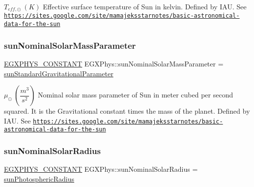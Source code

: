 $ T_{eff,\odot} \ (K)$ Effective surface temperature of Sun in kelvin. Defined by I\+AU. See \href{https://sites.google.com/site/mamajeksstarnotes/basic-astronomical-data-for-the-sun}{\tt https\+://sites.\+google.\+com/site/mamajeksstarnotes/basic-\/astronomical-\/data-\/for-\/the-\/sun} \mbox{\label{group___e_g_x_phys-_constants-_astrophysics-_solar_system-_sun-_bulk_gaadeeeb0634200ad2ad89a5b8b721dd8d}} 
\subsubsection{\texorpdfstring{sun\+Nominal\+Solar\+Mass\+Parameter}{sunNominalSolarMassParameter}}
{\footnotesize\ttfamily \mbox{\hyperlink{group___e_g_x_phys-_constants-_macros_ga76980d288494ce1714c9ac68a95ba702}{E\+G\+X\+P\+H\+Y\+S\+\_\+\+C\+O\+N\+S\+T\+A\+NT}} E\+G\+X\+Phys\+::sun\+Nominal\+Solar\+Mass\+Parameter = \mbox{\hyperlink{group___e_g_x_phys-_constants-_astrophysics-_solar_system-_sun-_bulk_ga17d411dceb8d2ff98b8a270eaa72117d}{sun\+Standard\+Gravitational\+Parameter}}}

$ \mu_{\odot} \ (\dfrac{m^3}{s^2})$ Nominal solar mass parameter of Sun in meter cubed per second squared. It is the Gravitational constant times the mass of the planet. Defined by I\+AU. See \href{https://sites.google.com/site/mamajeksstarnotes/basic-astronomical-data-for-the-sun}{\tt https\+://sites.\+google.\+com/site/mamajeksstarnotes/basic-\/astronomical-\/data-\/for-\/the-\/sun} \mbox{\label{group___e_g_x_phys-_constants-_astrophysics-_solar_system-_sun-_bulk_ga5bebe7d507ffd0372e8e1a20e3662d5d}} 
\subsubsection{\texorpdfstring{sun\+Nominal\+Solar\+Radius}{sunNominalSolarRadius}}
{\footnotesize\ttfamily \mbox{\hyperlink{group___e_g_x_phys-_constants-_macros_ga76980d288494ce1714c9ac68a95ba702}{E\+G\+X\+P\+H\+Y\+S\+\_\+\+C\+O\+N\+S\+T\+A\+NT}} E\+G\+X\+Phys\+::sun\+Nominal\+Solar\+Radius = \mbox{\hyperlink{group___e_g_x_phys-_constants-_astrophysics-_solar_system-_sun-_bulk_gac257be308fa17adaf47f3310c5c65377}{sun\+Photospheric\+Radius}}}

